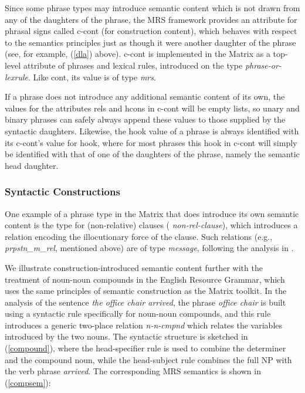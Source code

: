 \documentclass[12pt]{article}
\begin{document}
Since some phrase types may introduce semantic content which is not
drawn from any of the daughters of the phrase, the MRS framework
provides an attribute for phrasal signs called {\sc c-cont} (for
construction content), which behaves with respect to the semantics
principles just as though it were another daughter of the phrase (see,
for example, (\ref{dla}) above).  {\sc c-cont} is implemented in the
Matrix as a top-level attribute of phrases and lexical rules,
introduced on the type {\it phrase-or-lexrule}.  Like {\sc cont}, its
value is of type {\it mrs}.  

If a phrase does not introduce any additional semantic content of its
own, the values for the attributes {\sc rels} and {\sc hcons} in {\sc
c-cont} will be empty lists, so unary and binary phrases can safely
always append these values to those supplied by the syntactic
daughters.  Likewise, the {\sc hook} value of a phrase is always
identified with its {\sc c-cont}'s value for {\sc hook}, where for
most phrases this {\sc hook} in {\sc c-cont} will simply be identified
with that of one of the daughters of the phrase, namely the semantic
head daughter.

\subsubsection{Syntactic Constructions}

One example of a phrase type in the Matrix that does introduce its own
semantic content is the type for (non-relative) clauses ({\it
non-rel-clause}), which introduces a relation encoding the
illocutionary force of the clause.  Such relations (e.g., {\it
prpstn\_m\_rel}, mentioned above) are of type {\it message}, following the
analysis in \cite{Gin:Sag:00}.

We illustrate construction-introduced semantic content further with
the treatment of noun-noun compounds in the English Resource Grammar,
which uses the same principles of semantic construction as the Matrix
toolkit.  In the analysis of the sentence {\it the office chair
arrived}, the phrase {\it office chair} is built using a syntactic
rule specifically for noun-noun compounds, and this rule introduces a
generic two-place relation {\it n-n-cmpnd} which relates the variables
introduced by the two nouns.  The syntactic structure is sketched in
(\ref{compound}), where the head-specifier rule is used to combine the
determiner and the compound noun, while the head-subject rule combines
the full NP with the verb phrase {\it arrived}.  The corresponding MRS
semantics is shown in (\ref{compsem}):
\end{document}
